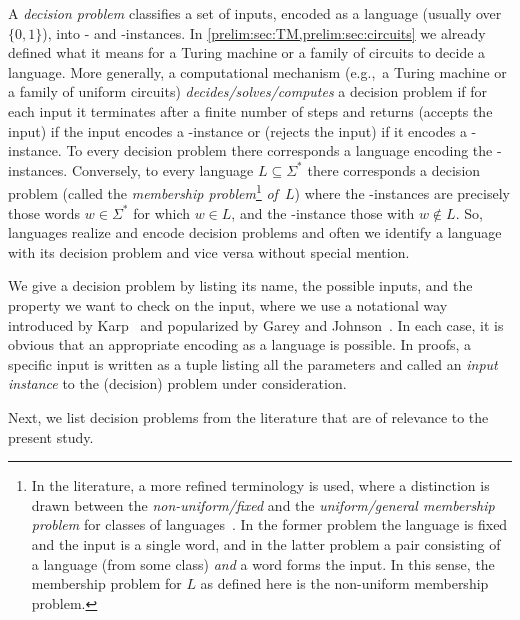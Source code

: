 A \emph{decision problem} classifies a set of inputs, encoded as a language (usually over $\{0,1\}$),
into \rYES- and \rNO-instances.
In \cref{prelim:sec:TM,prelim:sec:circuits} we already defined what
it means for a Turing machine or a family of circuits to decide
a language. More generally, a computational mechanism (e.g.,~a Turing machine
or a family of uniform circuits) \emph{decides/solves/computes} a 
decision problem if for each input it 
terminates after a finite number of steps and returns
\rYES (accepts the input) if the input encodes
a \rYES-instance or \rNO (rejects the input)
if it encodes a \rNO-instance.
To every decision problem there corresponds a language encoding the \rYES-instances.
Conversely, to every language $L \subseteq \Sigma^*$
there corresponds a decision problem (called the
\emph{membership problem}\footnote{In the literature, a more refined terminology
	is used, where a distinction 
	is drawn between the \emph{non-uniform/fixed} and the \emph{uniform/general
	membership problem} for classes of languages~\cite{HolzerK11}.
    In the former problem the language is fixed and the input is a single word, and
    in the latter problem
    a pair consisting of a language (from some class)
    \emph{and} a word forms the input.
    In this sense, the membership problem for $L$ as defined here
    is the non-uniform membership problem.
} \emph{of~$L$}) 
where the \rYES-instances
are precisely those words $w \in \Sigma^*$ for which $w \in L$,
and the \rNO-instance those with $w \notin L$.
So, languages realize and encode decision problems
and often we identify a language with its decision problem
and vice versa without special mention.

We give a decision problem by listing its name, the possible inputs,
and the property we want to check on the input,
where we use a notational way
introduced by Karp~\cite{Karp1972} 
and popularized by Garey and Johnson~\cite{garey1979computers}.
In each case, it is obvious that an appropriate encoding as a language is possible.
In proofs, a specific input is written as a tuple 
listing all the parameters and called an \emph{input instance} to the (decision) problem under consideration.

Next, we list decision problems from the literature that are of relevance to the present study. 


